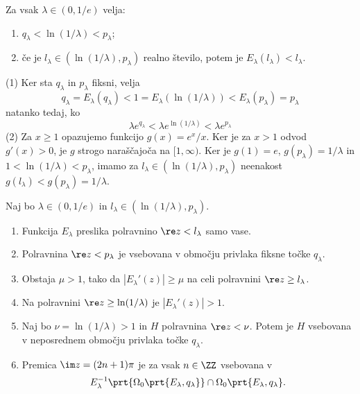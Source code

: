 \begin{lema} \label{lem:enadva}
    Za vsak \(\lambda \in (0, 1/e)\) velja:
    \begin{enumerate}[label=(\arabic*)]
        \item \(q_\lambda < \ln (1 / \lambda) < p_\lambda\);
        \item če je \(l_\lambda \in (\ln (1 / \lambda), p_\lambda)\) realno število, potem je \(E_\lambda (l_\lambda) < l_\lambda\).
    \end{enumerate}
\end{lema}

\begin{dokaz}
    (1) Ker sta \(q_\lambda\) in \(p_\lambda\) fiksni, velja
    \[q_\lambda = E_\lambda (q_\lambda) < 1 = E_\lambda (\ln (1 / \lambda)) < E_\lambda (p_\lambda) = p_\lambda\]
    natanko tedaj, ko
    \[\lambda e^{q_\lambda} < \lambda e^{\ln (1 / \lambda)} < \lambda e^{p_\lambda}\]
    (2) Za \(x \geq 1\) opazujemo funkcijo \(g (x) = e^x / x\). Ker je za \(x > 1\) odvod \(g' (x) > 0\), je \(g\) strogo naraščajoča na \([1, \infty)\). Ker je \(g (1) = e\), \(g (p_\lambda) = 1 / \lambda\) in \(1 < \ln (1 / \lambda) < p_\lambda\), imamo za \(l_\lambda \in (\ln (1 / \lambda), p_\lambda)\) neenakost \(g (l_\lambda) < g (p_\lambda) = 1 / \lambda\).
\end{dokaz}

\begin{trditev} \label{prop:trinajst}
    Naj bo \(\lambda \in (0, 1/e)\) in \(l_\lambda \in (\ln (1 / \lambda), p_\lambda)\).
    \begin{enumerate}[label=(\arabic*)]
        \item Funkcija \(E_\lambda\) preslika polravnino \(\re z < l_\lambda\) samo vase.
        \item Polravnina \(\re z < p_\lambda\) je vsebovana v območju privlaka fiksne točke \(q_\lambda\).
        \item Obstaja \(\mu > 1\), tako da \(|E_\lambda' (z)| \geq \mu\) na celi polravnini \(\re z \geq l_\lambda\).
        \item Na polravnini \(\re z \geq \ln (1 / \lambda)\) je \(|E_\lambda' (z)| > 1\).
        \item Naj bo \(\nu = \ln (1 / \lambda) > 1\) in \(H\) polravnina \(\re z < \nu\). Potem je \(H\) vsebovana v neposrednem območju privlaka točke \(q_\lambda\).
        \item Premica \(\im z = (2n + 1) \pi\) je za vsak \(n \in \ZZ\) vsebovana v
        \[E_\lambda^{-1} \prt{\Omega_0 \prt{E_\lambda, q_\lambda}} \cap \Omega_0 \prt{E_\lambda, q_\lambda}.\]
    \end{enumerate}
\end{trditev}

